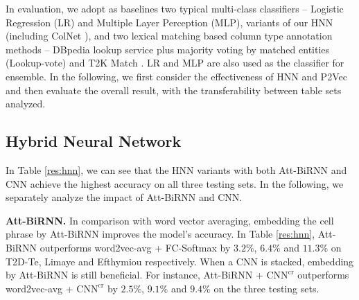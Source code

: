 \documentclass{article}
\begin{document}
In evaluation, we adopt as baselines two typical multi-class classifiers 
-- Logistic Regression (LR) and Multiple Layer Perception (MLP),
variants of our HNN (including ColNet \cite{chen2019colnet}), 
and two lexical matching based column type annotation methods --
DBpedia lookup service plus majority voting by matched entities \cite{zwicklbauer2013towards} (Lookup-vote) and T2K Match \cite{ritze2015matching}.
LR and MLP are also used as the classifier for ensemble.
In the following, we first consider the effectiveness of HNN and P2Vec
and then evaluate the overall result,
with the transferability between table sets analyzed.

\subsection{Hybrid Neural Network}
In Table \ref{res:hnn}, we can see that the HNN variants with both Att-BiRNN and CNN achieve the highest accuracy on all three testing sets.
In the following, we separately analyze the impact of Att-BiRNN and CNN.


\vspace{0.1cm}
\noindent \textbf{Att-BiRNN.}
In comparison with word vector averaging, embedding the cell phrase by Att-BiRNN improves the model's accuracy.
In Table \ref{res:hnn}, Att-BiRNN outperforms word2vec-avg + FC-Softmax by $3.2\%$, $6.4\%$ and $11.3\%$ on T2D-Te, Limaye and Efthymiou respectively.
When a CNN is stacked,
embedding by Att-BiRNN is still beneficial. 
For instance, Att-BiRNN + $\text{CNN} ^ {\text{cr}}$
outperforms word2vec-avg + $\text{CNN} ^ {\text{cr}}$ by $2.5\%$, $9.1\%$ and $9.4\%$ on the three testing sets.
\end{document}
